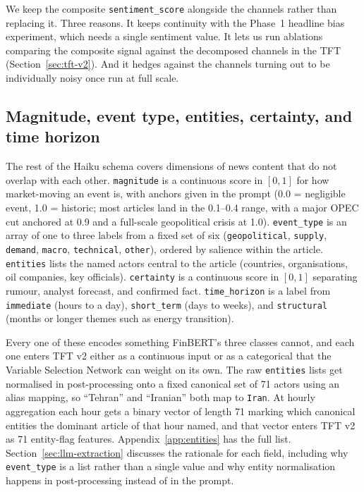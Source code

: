 We keep the composite \texttt{sentiment\_score} alongside the channels rather than replacing it. Three reasons. It keeps continuity with the Phase~1 headline bias experiment, which needs a single sentiment value. It lets us run ablations comparing the composite signal against the decomposed channels in the TFT (Section~\ref{sec:tft-v2}). And it hedges against the channels turning out to be individually noisy once run at full scale.

\subsection{Magnitude, event type, entities, certainty, and time horizon}\label{sec:other-fields}

The rest of the Haiku schema covers dimensions of news content that do not overlap with each other. \texttt{magnitude} is a continuous score in $[0, 1]$ for how market-moving an event is, with anchors given in the prompt (0.0 = negligible event, 1.0 = historic; most articles land in the 0.1--0.4 range, with a major OPEC cut anchored at 0.9 and a full-scale geopolitical crisis at 1.0). \texttt{event\_type} is an array of one to three labels from a fixed set of six (\texttt{geopolitical}, \texttt{supply}, \texttt{demand}, \texttt{macro}, \texttt{technical}, \texttt{other}), ordered by salience within the article. \texttt{entities} lists the named actors central to the article (countries, organisations, oil companies, key officials). \texttt{certainty} is a continuous score in $[0, 1]$ separating rumour, analyst forecast, and confirmed fact. \texttt{time\_horizon} is a label from \texttt{immediate} (hours to a day), \texttt{short\_term} (days to weeks), and \texttt{structural} (months or longer themes such as energy transition).

Every one of these encodes something FinBERT's three classes cannot, and each one enters TFT v2 either as a continuous input or as a categorical that the Variable Selection Network can weight on its own. The raw \texttt{entities} lists get normalised in post-processing onto a fixed canonical set of 71 actors using an alias mapping, so ``Tehran'' and ``Iranian'' both map to \texttt{Iran}. At hourly aggregation each hour gets a binary vector of length 71 marking which canonical entities the dominant article of that hour named, and that vector enters TFT v2 as 71 entity-flag features. Appendix~\ref{app:entities} has the full list. Section~\ref{sec:llm-extraction} discusses the rationale for each field, including why \texttt{event\_type} is a list rather than a single value and why entity normalisation happens in post-processing instead of in the prompt.


